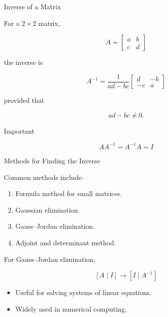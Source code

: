 \documentclass[aspectratio=169]{beamer}
\begin{document}
\begin{frame}{Inverse of a Matrix}
\small

For a $2\times2$ matrix,

$$
A=
\begin{bmatrix}
a&b\\
c&d
\end{bmatrix}
$$

the inverse is

$$
A^{-1}
=
\frac{1}{ad-bc}
\begin{bmatrix}
d&-b\\
-c&a
\end{bmatrix}
$$

provided that

$$
ad-bc\neq0.
$$

\begin{block}{Important}

$$
AA^{-1}=A^{-1}A=I
$$

\end{block}

\end{frame}

\begin{frame}{Methods for Finding the Inverse}
\small

Common methods include:

\begin{enumerate}
\item Formula method for small matrices.
\item Gaussian elimination.
\item Gauss--Jordan elimination.
\item Adjoint and determinant method.
\end{enumerate}

For Gauss--Jordan elimination,

$$
[A\mid I]\longrightarrow[I\mid A^{-1}]
$$

\begin{itemize}
\item Useful for solving systems of linear equations.
\item Widely used in numerical computing.
\end{itemize}

\end{frame}

\end{document}
